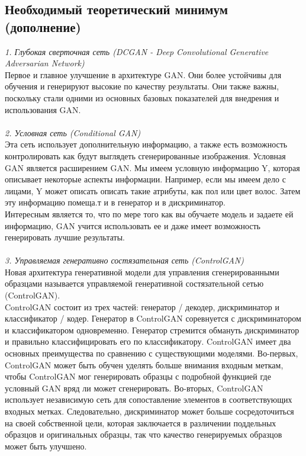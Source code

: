 \documentclass{article}
\begin{document}
    \newpage
    \begin{center} 
    \section{Необходимый теоретический минимум (дополнение)}
    \end{center} 
    \large 
    \textit{1. Глубокая сверточная сеть (DCGAN - Deep Convolutional Generative Adversarian Network)}
    \\
    Первое и главное улучшение в архитектуре GAN. Они более устойчивы для обучения и генерируют высокие по качеству результаты. Они также важны, поскольку стали одними из основных базовых показателей для внедрения и использования GAN. 
    \\ \\
    \textit{2. Условная сеть (Conditional GAN)}
    \\
    Эта сеть использует дополнительную информацию, а также есть возможность контролировать как будут выглядеть сгенерированные изображения. Условная GAN является расширением GAN. Мы имеем условную информацию Y, которая описывает некоторые аспекты информации. Например, если мы имеем дело с лицами, Y может описать описать такие атрибуты, как пол или цвет волос. Затем эту информацию помеща.т и в генератор и в дискриминатор. \\
    Интересным является то, что по мере того как вы обучаете модель и задаете ей информацию, GAN учится использовать ее и даже имеет возможность генерировать лучшие результаты.
    \\ \\
    \textit{3. Управляемая генеративно состязательная сеть (ControlGAN)}
    \\
    Новая архитектура генеративной модели для управления сгенерированными образцами называется управляемой генеративной состязательной сетью (ControlGAN). 
    \\
    ControlGAN состоит из трех частей: генератор / декодер, дискриминатор и классификатор / кодер. Генератор в ControlGAN соревнуется с дискриминатором и классификатором одновременно.
    Генератор стремится обмануть дискриминатор и правильно классифицировать его по классификатору. ControlGAN имеет два основных преимущества по сравнению с существующими моделями. 
    Во-первых, ControlGAN может быть обучен уделять больше внимания входным меткам, чтобы ControlGAN мог генерировать образцы с подробной функцией где условный GAN вряд ли может сгенерировать. Во-вторых, ControlGAN использует независимую сеть для сопоставление элементов в соответствующих входных метках. Следовательно, дискриминатор может больше сосредоточиться на своей собственной цели, которая заключается в различении поддельных образцов и оригинальных образцы, так что качество генерируемых образцов может быть улучшено.
\end{document}
